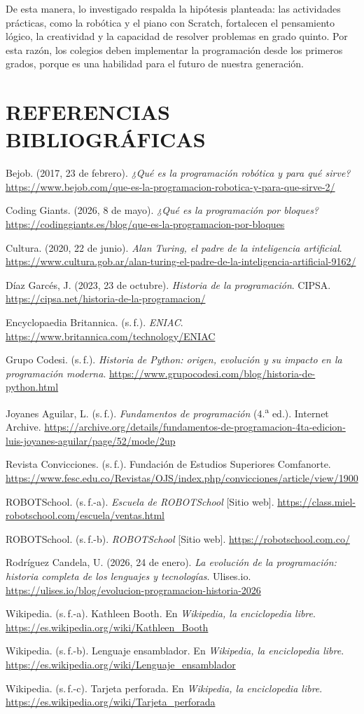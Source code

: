 \documentclass[12pt,letterpaper]{article}
\newenvironment{referencias}{\begin{list}{}{\setlength{\leftmargin}{1.27cm}\setlength{\itemindent}{-1.27cm}\setlength{\itemsep}{6pt}\setlength{\parsep}{0pt}\raggedright}\singlespacing}{\end{list}}
\newcommand{\refitem}[1]{\item #1}
\begin{document}
De esta manera, lo investigado respalda la hipótesis planteada: las actividades prácticas, como la robótica y el piano con Scratch, fortalecen el pensamiento lógico, la creatividad y la capacidad de resolver problemas en grado quinto. Por esta razón, los colegios deben implementar la programación desde los primeros grados, porque es una habilidad para el futuro de nuestra generación.

\section{REFERENCIAS BIBLIOGRÁFICAS}
\begin{referencias}
\refitem{Bejob. (2017, 23 de febrero). \textit{¿Qué es la programación robótica y para qué sirve?} \url{https://www.bejob.com/que-es-la-programacion-robotica-y-para-que-sirve-2/}}
\refitem{Coding Giants. (2026, 8 de mayo). \textit{¿Qué es la programación por bloques?} \url{https://codinggiants.es/blog/que-es-la-programacion-por-bloques}}
\refitem{Cultura. (2020, 22 de junio). \textit{Alan Turing, el padre de la inteligencia artificial}. \url{https://www.cultura.gob.ar/alan-turing-el-padre-de-la-inteligencia-artificial-9162/}}
\refitem{Díaz Garcés, J. (2023, 23 de octubre). \textit{Historia de la programación}. CIPSA. \url{https://cipsa.net/historia-de-la-programacion/}}
\refitem{Encyclopaedia Britannica. (s.\,f.). \textit{ENIAC}. \url{https://www.britannica.com/technology/ENIAC}}
\refitem{Grupo Codesi. (s.\,f.). \textit{Historia de Python: origen, evolución y su impacto en la programación moderna}. \url{https://www.grupocodesi.com/blog/historia-de-python.html}}
\refitem{Joyanes Aguilar, L. (s.\,f.). \textit{Fundamentos de programación} (4.\textsuperscript{a} ed.). Internet Archive. \url{https://archive.org/details/fundamentos-de-programacion-4ta-edicion-luis-joyanes-aguilar/page/52/mode/2up}}
\refitem{Revista Convicciones. (s.\,f.). Fundación de Estudios Superiores Comfanorte. \url{https://www.fesc.edu.co/Revistas/OJS/index.php/convicciones/article/view/1900}}
\refitem{ROBOTSchool. (s.\,f.-a). \textit{Escuela de ROBOTSchool} [Sitio web]. \url{https://class.miel-robotschool.com/escuela/ventas.html}}
\refitem{ROBOTSchool. (s.\,f.-b). \textit{ROBOTSchool} [Sitio web]. \url{https://robotschool.com.co/}}
\refitem{Rodríguez Candela, U. (2026, 24 de enero). \textit{La evolución de la programación: historia completa de los lenguajes y tecnologías}. Ulises.io. \url{https://ulises.io/blog/evolucion-programacion-historia-2026}}
\refitem{Wikipedia. (s.\,f.-a). Kathleen Booth. En \textit{Wikipedia, la enciclopedia libre}. \url{https://es.wikipedia.org/wiki/Kathleen_Booth}}
\refitem{Wikipedia. (s.\,f.-b). Lenguaje ensamblador. En \textit{Wikipedia, la enciclopedia libre}. \url{https://es.wikipedia.org/wiki/Lenguaje_ensamblador}}
\refitem{Wikipedia. (s.\,f.-c). Tarjeta perforada. En \textit{Wikipedia, la enciclopedia libre}. \url{https://es.wikipedia.org/wiki/Tarjeta_perforada}}
\end{referencias}
\end{document}
